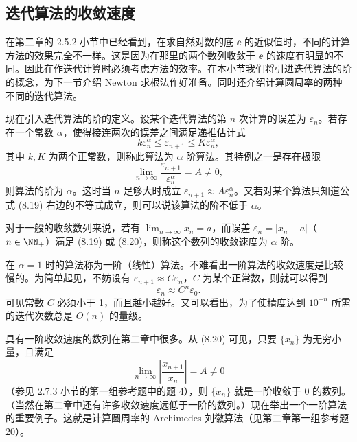 \subsection{迭代算法的收敛速度}

在第二章的 2.5.2 小节中已经看到，在求自然对数的底 $\ee$ 的近似值时，不同的计算方法的效果完全不一样。这是因为在那里的两个数列收敛于 $\ee$ 的速度有明显的不同。因此在作迭代计算时必须考虑方法的效率。在本小节我们将引进迭代算法的阶的概念，为下一节介绍 Newton 求根法作好准备。同时还介绍计算圆周率的两种不同的迭代算法。

现在引入迭代算法的阶的定义。设某个迭代算法的第 $n$ 次计算的误差为 $\varepsilon_n$。若存在一个常数 $\alpha$，使得接连两次的误差之间满足递推估计式
\begin{equation}
  k\varepsilon_n^\alpha\le\varepsilon_{n+1}\le K\varepsilon_n^\alpha,
  \tag{8.19}
  \label{eq:8.19}
\end{equation}
其中 $k,K$ 为两个正常数，则称此算法为 $\alpha$ 阶算法。其特例之一是存在极限
\begin{equation}
  \lim_{n\to\infty}\frac{\varepsilon_{n+1}}{\varepsilon_n^\alpha}=A\ne0,
  \tag{8.20}
  \label{eq:8.20}
\end{equation}
则算法的阶为 $\alpha$。这时当 $n$ 足够大时成立 $\varepsilon_{n+1}\approx A\varepsilon_n^\alpha$。又若对某个算法只知道公式 (8.19) 右边的不等式成立，则可以说该算法的阶不低于 $\alpha$。

对于一般的收敛数列来说，若有 $\lim_{n\to\infty}x_n=a$，而误差 $\varepsilon_n=|x_n-a|$（$n\in\NN_+$）满足 (8.19) 或 (8.20)，则称这个数列的收敛速度为 $\alpha$ 阶。

在 $\alpha=1$ 时的算法称为一阶（线性）算法。不难看出一阶算法的收敛速度是比较慢的。为简单起见，不妨设有 $\varepsilon_{n+1}\approx C\varepsilon_n$，$C$ 为某个正常数，则就可以得到
\begin{equation}
  \varepsilon_n\approx C^n\varepsilon_0.
  \tag{8.21}
  \label{eq:8.21}
\end{equation}
可见常数 $C$ 必须小于 1，而且越小越好。又可以看出，为了使精度达到 $10^{-n}$ 所需的迭代次数总是 $O(n)$ 的量级。

具有一阶收敛速度的数列在第二章中很多。从 (8.20) 可见，只要 $\{x_n\}$ 为无穷小量，且满足
\[
  \lim_{n\to\infty}\left|\frac{x_{n+1}}{x_n}\right|=A\ne0
\]
（参见 2.7.3 小节的第一组参考题中的题 4），则 $\{x_n\}$ 就是一阶收敛于 0 的数列。（当然在第二章中还有许多收敛速度远低于一阶的数列。）现在举出一个一阶算法的重要例子。这就是计算圆周率的 Archimedes-刘徽算法（见第二章第一组参考题 20）。

